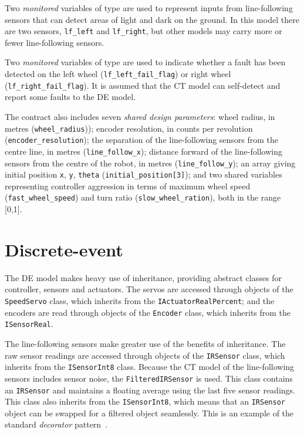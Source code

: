 Two \emph{monitored} variables of type  are used to represent
inputs from line-following sensors that can detect areas of light and
dark on the ground.  In this model there are two sensors,
\texttt{lf\_left} and \texttt{lf\_right}, but other models may carry more
or fewer line-following sensors.

Two \emph{monitored} variables of type  are used to indicate
 whether a fault has been detected on the left wheel
 (\texttt{lf\_left\_fail\_flag}) or right wheel
 (\texttt{lf\_right\_fail\_flag}).  It is assumed that the CT model can
 self-detect and report some faults to the DE model.


The contract also includes seven \emph{shared design parameters}: wheel radius, in metres (\texttt{wheel\_\-radius})); encoder resolution, in counts per revolution (\texttt{encoder\_resolution}); the separation of the line-following sensors from the centre line, in metres (\texttt{line\_follow\_x}); distance forward of the line-following sensors from the centre of the robot, in metres (\texttt{line\_follow\_y}); an array giving initial position \texttt{x}, \texttt{y}, \texttt{theta} (\texttt{initial\_position[3]}); and two shared variables representing controller aggression in terms of maximum wheel speed (\texttt{fast\_wheel\_speed}) and turn ratio (\texttt{slow\_wheel\_ration}), both in the range [0,1].

\section{Discrete-event}

The DE model makes heavy use of inheritance, providing abstract
classes for controller, sensors and actuators. The servos are accessed through objects of the \texttt{SpeedServo} class, which inherits from the \texttt{IActuatorRealPercent}; and the encoders are read through objects of the \texttt{Encoder} class, which inherits from the \texttt{ISensorReal}.

The line-following sensors make greater use of the benefits of inheritance. The raw sensor readings are accessed through objects of the \texttt{IRSensor} class, which inherits from the \texttt{ISensorInt8} class. Because the CT model of the line-following sensors includes sensor noise, the \texttt{Filtered\-IR\-Sensor} is used. This class contains an \texttt{IRSensor} and maintains a floating average using the last five sensor readings. This class also inherits from the \texttt{ISensorInt8}, which means that an \texttt{IRSensor} object can be swapped for a filtered object seamlessly. This is an example of the standard \emph{decorator} pattern~\cite{DESIGNPAT95}.

